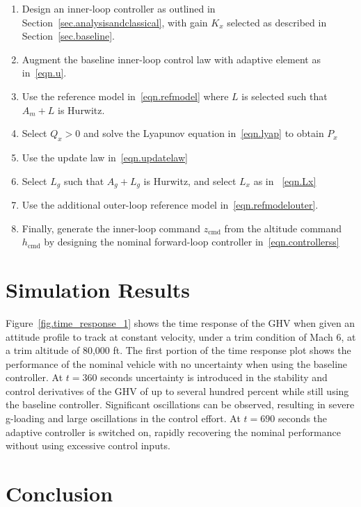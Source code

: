 \documentclass[]{../sty/aiaa-tc}
\theoremstyle{examplestyle}
\begin{document}
  \begin{enumerate}
    \setlength{\itemsep}{0pt}
    \item{Design an inner-loop controller as outlined in Section~\ref{sec.analysisandclassical}, with gain $K_{x}$ selected as described in Section~\ref{sec.baseline}.}
    \item{Augment the baseline inner-loop control law with adaptive element as in\ \eqref{eqn.u}.}
    \item{Use the reference model in\ \eqref{eqn.refmodel} where $L$ is selected such that $A_{m}+L$ is Hurwitz.}
    \item{Select $Q_{x}>0$ and  solve the Lyapunov equation in\ \eqref{eqn.lyap} to obtain $P_{x}$}
    \item{Use the update law in\ \eqref{eqn.updatelaw}}
    \item{Select $L_{g}$ such that $A_{g}+L_{g}$ is Hurwitz, and select $L_{x}$ as in \ \eqref{eqn.Lx}}
    \item{Use the additional outer-loop reference model in\ \eqref{eqn.refmodelouter}.}
    \item{Finally, generate the inner-loop command $z_{\text{cmd}}$ from the altitude command $h_{\text{cmd}}$ by designing the nominal forward-loop controller in\ \eqref{eqn.controllerss}}
  \end{enumerate}

  \section{Simulation Results}\label{sec.simulationresults}

  Figure~\ref{fig.time_response_1} shows the time response of the GHV when given an attitude profile to track at constant velocity, under a trim condition of Mach 6, at a trim altitude of 80,000 ft.
  The first portion of the time response plot shows the performance of the nominal vehicle with no uncertainty when using the baseline controller.
  At $t = 360$ seconds uncertainty is introduced in the stability and control derivatives of the GHV of up to several hundred percent while still using the baseline controller.
  Significant oscillations can be observed, resulting in severe g-loading and large oscillations in the control effort.
  At $t = 690$ seconds the adaptive controller is switched on, rapidly recovering the nominal performance without using excessive control inputs.

  \section{Conclusion}
\end{document}
